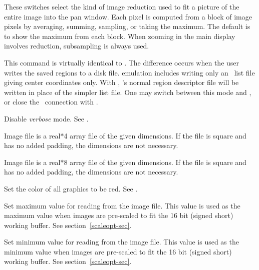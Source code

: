 \begin{description}
These switches select the kind of image reduction used to fit
a picture of the entire image into the pan window.  Each pixel
is computed from a block of image pixels by averaging, summing,
sampling, or taking the maximum.  The default is to show the
maximum from each block.  When zooming in the main display
involves reduction, subsampling is always used.


This command is virtually identical to .
The difference occurs when the user writes the saved
regions to a disk file.   emulation includes writing
only an \IRAF\ list file giving center coordinates only.  With
, \SAO's normal region descriptor file will be
written in place of the simpler list file.  One may switch between
this mode and , or close the \IRAF\ connection with
.


Disable {\em verbose} mode.  See .


Image file is a real$*$4 array file of the given dimensions.
If the file is square and has no added padding, the dimensions
are not necessary.


Image file is a real$*$8 array file of the given dimensions.
If the file is square and has no added padding, the dimensions
are not necessary.


Set the color of all graphics to be red.  See .


Set maximum value for reading from the image file.  This value
is used as the maximum value when images are pre-scaled to fit
the 16 bit (signed short) working buffer.  See section~\ref{scaleopt-sec}.


Set minimum value for reading from the image file.  This value
is used as the minimum value when images are pre-scaled to fit
the 16 bit (signed short) working buffer.  See section~\ref{scaleopt-sec}.


\end{description}
